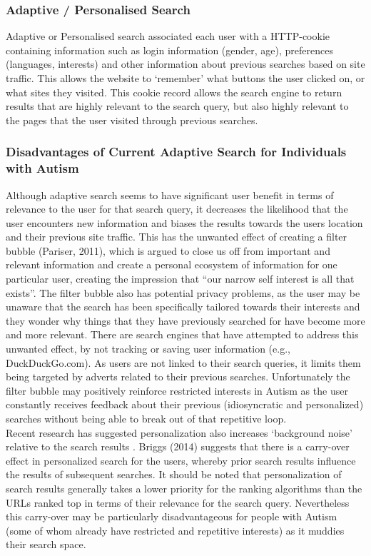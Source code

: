 \documentclass[a4paper, 11pt]{article}
\begin{document}
\subsubsection{Adaptive / Personalised Search}
Adaptive or Personalised search associated each user with a HTTP-cookie containing information such as login information (gender, age), preferences (languages, interests) and other information about previous searches based on site traffic. This allows the website to ‘remember’ what buttons the user clicked on, or what sites they visited. This cookie record allows the search engine to return results that are highly relevant to the search query, but also highly relevant to the pages that the user visited through previous searches. 

\subsubsection{Disadvantages of Current Adaptive Search for Individuals with Autism}
Although adaptive search seems to have significant user benefit in terms of relevance to the user for that search query, it decreases the likelihood that the user encounters new information and biases the results towards the users location and their previous site traffic.  This has the unwanted effect of creating a filter bubble (Pariser, 2011), which is argued to close us off from important and relevant information and create a personal ecosystem of information for one particular user, creating the impression that “our narrow self interest is all that exists”. The filter bubble also has potential privacy problems, as the user may be unaware that the search has been specifically tailored towards their interests and they wonder why things that they have previously searched for have become more and more relevant. There are search engines that have attempted to address this unwanted effect, by not tracking or saving user information (e.g., DuckDuckGo.com). As users are not linked to their search queries, it limits them being targeted by adverts related to their previous searches. Unfortunately the filter bubble may positively reinforce restricted interests in Autism as the user constantly receives feedback about their previous (idiosyncratic and personalized) searches without being able to break out of that repetitive loop. \\Recent research has suggested personalization also increases ‘background noise’ relative to the search results \cite{briggs}. Briggs (2014) suggests that there is a carry-over effect in personalized search for the users, whereby prior search results influence the results of subsequent searches. It should be noted that personalization of search results generally takes a lower priority for the ranking algorithms than the URLs ranked top in terms of their relevance for the search query. Nevertheless this carry-over may be particularly disadvantageous for people with Autism (some of whom already have restricted and repetitive interests) as it muddies their search space.\\
\end{document}
